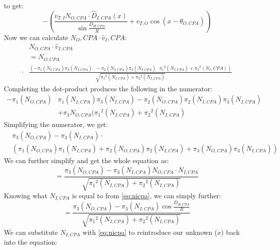 to get:
\begin{equation}
    - \left( \frac{v_{T,I}N_{O,CPA} \cdot \hat{D}_{I,CPA}(x)}{\sin{\frac{D_{H,CPA}}{R}}} + v_{T,O} \cos{(x-\theta_{O,CPA})} \right)
\end{equation}
Now we can calculate \(N_O,CPA \cdot \hat{v}_I,CPA\):
\begin{equation}
    \begin{aligned}
        &N_{O,CPA} \cdot \hat{v}_{I,CPA} \\
        &= N_{O,CPA} \\ \cdot
        & \frac{(-\pi_{1}(N_{I,CPA})\pi_{3}(N_{I,CPA}) \ \ \ -\pi_{2}(N_{I,CPA})\pi_{3}(N_{I,CPA}) \ \ \ \pi_{1}{}^{2}(N_{I,CPA}) + \pi_{2}{}^{2}(N_I,CPA))}{\sqrt{\pi_{1}{}^{2}(N_{I,CPA}) + \pi_{2}{}^{2}(N_{I,CPA})}}
    \end{aligned}
\end{equation}
Completing the dot-product produces the following in the numerator:
\begin{equation}
    \begin{aligned}
        -\pi_{1}(N_{O,CPA})&\pi_{1}(N_{I,CPA})\pi_{3}(N_{I,CPA}) - \pi_{2}(N_{O,CPA})\pi_{2}(N_{I,CPA})\pi_{3}(N_{I,CPA}) \\
        &+ \pi_{3}N_{O,CPA}(\pi_{1}{}^{2}(N_{I,CPA}) + \pi_{2}{}^{2}(N_{I,CPA})
    \end{aligned}
\end{equation}
Simplifying the numerator, we get:
\begin{equation}
    \begin{aligned}
        &\pi_{3}(N_{O,CPA}) - \pi_{3}(N_{I,CPA}) \cdot \\ 
        &(\pi_{1}(N_{O,CPA})\pi_{1}(N_{I,CPA}) + \pi_{2}(N_{O,CPA})\pi_{2}(N_{I,CPA}) + \pi_{3}(N_{O,CPA})\pi_{3}(N_{I,CPA}))
    \end{aligned}
\end{equation}
We can further simplify and get the whole equation as:
\begin{equation}
    = \frac{\pi_{3}(N_{O,CPA})-\pi_{3}(N_{I,CPA})N_{O,CPA} \cdot N_{I,CPA}}{\sqrt{\pi_{1}{}^{2}(N_{I,CPA}) + \pi_{2}{}^{2}(N_{I,CPA})}}
\end{equation}
Knowing what \(N_{I,CPA}\) is equal to from \ref{eq:nicpa}, we can simply further:
\begin{equation}
    = \frac{\pi_{3}(N_{O,CPA})-\pi_{3}(N_{I,CPA})\cos{\frac{D_{H,CPA}}{R}}}{\sqrt{\pi_{1}{}^{2}(N_{I,CPA}) + \pi_{2}{}^{2}(N_{I,CPA})}}
\end{equation}
We can substitute \(N_{I,CPA}\) with \ref{eq:nicpa} to reintroduce our unknown (\(x\)) back into the equation:

